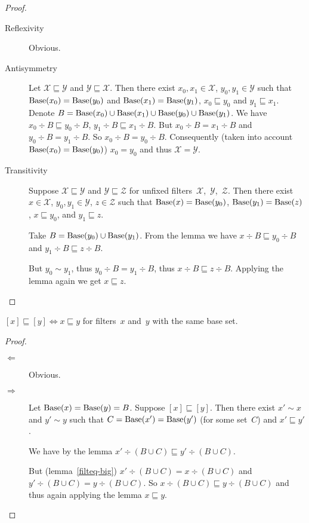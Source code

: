 \begin{proof}
~
\begin{description}
\item[Reflexivity] Obvious.
\item[Antisymmetry] Let $\mathcal{X}\sqsubseteq\mathcal{Y}$
and $\mathcal{Y}\sqsubseteq\mathcal{X}$. Then there exist
$x_0,x_1\in\mathcal{X}$, $y_0,y_1\in\mathcal{Y}$ such that
$\operatorname{Base}(x_0)=\operatorname{Base}(y_0)$ and $\operatorname{Base}(x_1)=\operatorname{Base}(y_1)$,
$x_0\sqsubseteq y_0$ and $y_1\sqsubseteq x_1$.
Denote $B=\operatorname{Base}(x_0)\cup\operatorname{Base}(x_1)\cup\operatorname{Base}(y_0)\cup\operatorname{Base}(y_1)$.
We have $x_0\div B\sqsubseteq y_0\div B$,
$y_1\div B\sqsubseteq x_1\div B$.
But $x_0\div B=x_1\div B$ and $y_0\div B=y_1\div B$.
So $x_0\div B=y_0\div B$. Consequently (taken into account
$\operatorname{Base}(x_0)=\operatorname{Base}(y_0)$) $x_0=y_0$ and thus $\mathcal{X}=\mathcal{Y}$.
\item[Transitivity] Suppose
$\mathcal{X}\sqsubseteq\mathcal{Y}$ and
$\mathcal{Y}\sqsubseteq\mathcal{Z}$ for unfixed
filters~$\mathcal{X}$,~$\mathcal{Y}$,~$\mathcal{Z}$.
Then there exist $x\in\mathcal{X}$, $y_0,y_1\in\mathcal{Y}$,
$z\in\mathcal{Z}$ such that
$\operatorname{Base}(x)=\operatorname{Base}(y_0)$, $\operatorname{Base}(y_1)=\operatorname{Base}(z)$,
$x\sqsubseteq y_0$, and $y_1\sqsubseteq z$.

Take $B=\operatorname{Base}(y_0)\cup\operatorname{Base}(y_1)$. From the lemma we have
$x\div B\sqsubseteq y_0\div B$ and
$y_1\div B\sqsubseteq z\div B$.

But $y_0\sim y_1$, thus $y_0\div B=y_1\div B$, thus
$x\div B\sqsubseteq z\div B$. Applying the lemma again
we get $x\sqsubseteq z$.
\end{description}
\end{proof}

\begin{thm}
$[x]\sqsubseteq[y] \Leftrightarrow x\sqsubseteq y$ for
filters~$x$ and~$y$ with the same base set.
\end{thm}

\begin{proof}
~
\begin{description}
\item[$\Leftarrow$] Obvious.

\item[$\Rightarrow$] Let $\operatorname{Base}(x)=\operatorname{Base}(y)=B$.
Suppose $[x]\sqsubseteq[y]$. Then
there exist $x'\sim x$ and $y'\sim y$ such that
$C=\operatorname{Base}(x')=\operatorname{Base}(y')$ (for some set~$C$) and
$x'\sqsubseteq y'$.

We have by the lemma
$x'\div(B\cup C)\sqsubseteq y'\div(B\cup C)$.

But (lemma~\ref{filteq-big})
$x'\div(B\cup C)=x\div(B\cup C)$ and
$y'\div(B\cup C)=y\div(B\cup C)$. So
$x\div(B\cup C)\sqsubseteq y\div(B\cup C)$ and thus again
applying the lemma $x\sqsubseteq y$.
\end{description}
\end{proof}

